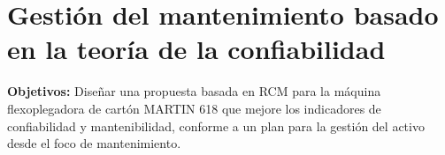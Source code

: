 \section{Gestión del mantenimiento basado en la teoría de la confiabilidad}




\begin{description}
\item \textbf{Objetivos:} Diseñar una propuesta basada en RCM para la máquina flexoplegadora de cartón MARTIN 618 que mejore los indicadores de confiabilidad y mantenibilidad, conforme a un plan para la gestión del activo desde el foco de mantenimiento. 

\end{description}

